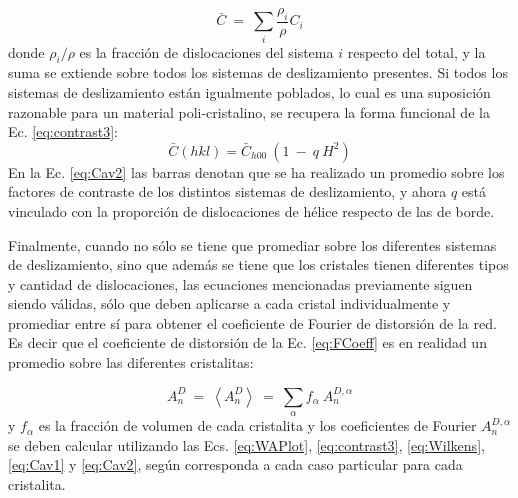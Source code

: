\begin{equation}
  \bar{C} \ = \ \sum_i \frac{\rho_i}{\rho} C_i
  \label{eq:Cav1}
\end{equation}
\noindent
donde $\rho_i/\rho$ es la fracción de dislocaciones del sistema $i$ respecto del total, y la suma se extiende sobre todos los sistemas de deslizamiento presentes.
Si todos los sistemas de deslizamiento están igualmente poblados, lo cual es una suposición razonable para un material poli-cristalino, se recupera la forma funcional de la Ec. \ref{eq:contrast3}:
\begin{equation}
  \bar{C}(hkl) = \bar{C}_{h00}\ (1 \ - \ q\ H^2)
  \label{eq:Cav2}
\end{equation}
\noindent
En la Ec. \ref{eq:Cav2} las barras denotan que se ha realizado un promedio sobre los factores de contraste de los distintos sistemas de deslizamiento, y ahora $q$ está vinculado con la proporción de dislocaciones de hélice respecto de las de borde.

Finalmente, cuando no sólo se tiene que promediar sobre los diferentes sistemas de deslizamiento, sino que además se tiene que los cristales tienen diferentes tipos y cantidad de dislocaciones, las ecuaciones mencionadas previamente siguen siendo válidas, sólo que deben aplicarse a cada cristal individualmente y promediar entre sí para obtener el coeficiente de Fourier de distorsión de la red. Es decir que el coeficiente de distorsión de la Ec. \ref{eq:FCoeff} es en realidad un promedio sobre las diferentes cristalitas:

\begin{equation}
  A_n^D \ = \ \left< A_n^D \right> \ = \ \sum_{\alpha} f_{\alpha} \ A_{n}^{D,\alpha}
  \label{eq:FCoeffAv}
\end{equation}
\noindent
y $f_{\alpha}$ es la fracción de volumen de cada cristalita y los coeficientes de Fourier $A_{n}^{D,\alpha}$ se deben calcular utilizando las Ecs. \ref{eq:WAPlot}, \ref{eq:contrast3}, \ref{eq:Wilkens}, \ref{eq:Cav1} y \ref{eq:Cav2}, según corresponda a cada caso particular para cada cristalita.

